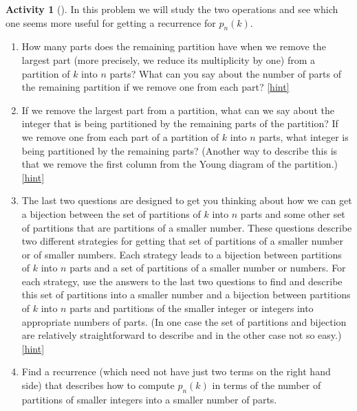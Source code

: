 \documentclass[10pt,]{book}
\theoremstyle{plain}
\theoremstyle{definition}
\theoremstyle{definition}
\theoremstyle{definition}
\newtheorem{activity}[project]{Activity}
\numberwithin{equation}{chapter}
\begin{document}
\begin{activity}[]\label{numberpartitionrecurrence}
\hypertarget{p-1142}{}%
In this problem we will study the two operations and see which one seems more useful for getting a recurrence for \(p_n(k)\).%
\begin{enumerate}[font=\bfseries,label=(\alph*),ref=\alph*]
\item\label{task-217} \hypertarget{p-1143}{}%
How many parts does the remaining partition have when we remove the largest part (more precisely, we reduce its multiplicity by one) from a partition of \(k\) into \(n\) parts?  What can you say about the number of parts of the remaining partition if we remove one from each part?%
\hfill{\tiny\hyperlink{a-215.a}{[hint]}\hypertarget{q-215.a}{}}\item\label{task-218} \hypertarget{p-1146}{}%
If we remove the largest part from a partition, what can we say about the integer that is being partitioned by the remaining parts of the partition? If we remove one from each part of a partition of \(k\) into \(n\) parts, what integer is being partitioned by the remaining parts? (Another way to describe this is that we remove the first column from the Young diagram of the partition.)%
\hfill{\tiny\hyperlink{a-215.b}{[hint]}\hypertarget{q-215.b}{}}\item\label{task-219} \hypertarget{p-1149}{}%
The last two questions are designed to get you thinking about how we can get a bijection between the set of partitions of \(k\) into \(n\) parts and some other set of partitions that are partitions of a smaller number.  These questions describe two different strategies for getting that set of partitions of a smaller number or of smaller numbers.  Each strategy leads to a bijection between partitions of \(k\) into \(n\) parts and a set of partitions of a smaller number or numbers.  For each strategy, use the answers to the last two questions to find and describe this set of partitions into a smaller number and a bijection between partitions of \(k\) into \(n\) parts and partitions of the smaller integer or integers into appropriate numbers of parts. (In one case the set of partitions and bijection are relatively straightforward to describe and in the other case not so easy.)%
\hfill{\tiny\hyperlink{a-215.c}{[hint]}\hypertarget{q-215.c}{}}\item\label{task-220} \hypertarget{p-1153}{}%
Find a recurrence (which need not have just two terms on the right hand side) that describes how to compute \(p_n(k)\) in terms of the number of partitions of smaller integers into a smaller number of parts.%

\end{enumerate}
\end{activity}
\end{document}

